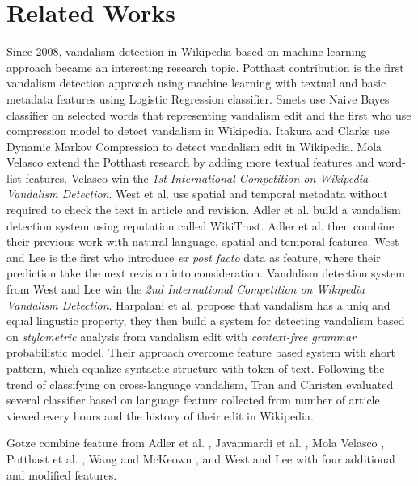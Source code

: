 \documentclass[conference,compsoc,a4paper,twocolumn,final]{IEEEtran}
\begin{document}

\section{Related Works}

Since 2008, vandalism detection in Wikipedia based on machine learning approach
became an interesting research topic.
Potthast \cite{potthast2008automatic} contribution is the first vandalism
detection approach using machine learning with textual and basic
metadata features using Logistic Regression classifier.
Smets \cite{smets08automaticvandalism} use Naive Bayes classifier on selected
words that representing vandalism edit and the first who use compression model
to detect vandalism in Wikipedia.
Itakura and Clarke \cite{itakura2009using} use Dynamic Markov Compression to
detect vandalism edit in Wikipedia.
Mola Velasco \cite{mola2012wikipedia} extend the Potthast research by adding
more textual features and word-list features.
Velasco win the \textit{1st International Competition on Wikipedia Vandalism
Detection}.
West et al. \cite{west2011multilingual} use spatial and temporal metadata
without required to check the text in article and revision.
Adler et al. \cite{adler2011wikipedia} build a vandalism detection system using
reputation called WikiTrust.
Adler et al. \cite{adler2011wikipedia} then combine their previous work with
natural language, spatial and temporal features.
West and Lee \cite{west2011multilingual} is the first who introduce
\textit{ex post facto} data as feature, where their prediction take the next
revision into consideration.
Vandalism detection system from West and Lee win the \textit{2nd International
Competition on Wikipedia Vandalism Detection}.
Harpalani et al. \cite{harpalani2011language} propose that vandalism has
a uniq and equal lingustic property, they then build a system for detecting
vandalism based on \textit{stylometric} analysis from vandalism edit with
\textit{context-free grammar} probabilistic model.
Their approach overcome feature based system with short pattern, which equalize
syntactic structure with token of text.
Following the trend of classifying on cross-language vandalism, Tran and
Christen \cite{tran2013cross} evaluated several classifier based on
language feature collected from number of article viewed every hours and the
history of their edit in Wikipedia.

Gotze \cite{gotze2014advanced} combine feature from
Adler et al. \cite{adler2011wikipedia},
Javanmardi et al. \cite{javanmardi2011vandalism},
Mola Velasco \cite{mola2012wikipedia},
Potthast et al. \cite{potthast2008automatic},
Wang and McKeown \cite{wang2010got}, and
West and Lee \cite{west2011multilingual}
with four additional and modified features.
\end{document}
